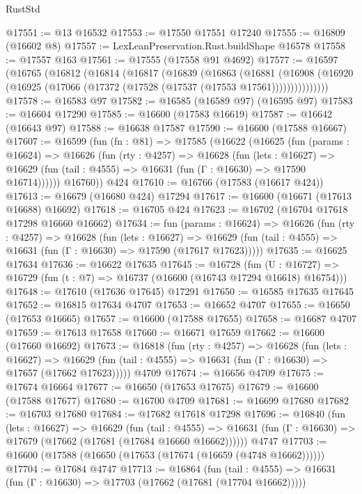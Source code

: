 \begin{lexlean}{RustStd}
\begin{coremodule}
{\begin{coremodule}
{{{{{{{{{{{{{{{{{{{{{{{{{{{{{{{{{{{{{{{{{{{{{{{{{{{{{{{@17551 := @13 @16532
@17553 := @17550 @17551 @17240
@17555 := @16809 (@16602 @8)
@17557 := LexLeanPreservation.Rust.buildShape @16578
@17558 := @17557 @163
@17561 := @17555 (@17558 @91 @4692)
@17577 := @16597
    (@16765
      (@16812
        (@16814
          (@16817
            (@16839
              (@16863
                (@16881
                  (@16908
                    (@16920 (@16925 (@17066 (@17372 (@17528 (@17537 (@17553 @17561)))))))))))))))
@17578 := @16583 @97
@17582 := @16585 (@16589 @97) (@16595 @97)
@17583 := @16604 @17290
@17585 := @16600 (@17583 @16619)
@17587 := @16642 (@16643 @97)
@17588 := @16638 @17587
@17590 := @16600 (@17588 @16667)
@17607 := @16599
    (fun (fn : @81) =>
    @17585
      (@16622
        (@16625
          (fun (params : @16624) =>
          @16626
            (fun (rty : @4257) =>
            @16628
              (fun (lets : @16627) =>
              @16629 (fun (tail : @4555) => @16631 (fun (Γ : @16630) => @17590 @16714))))))
        @16760))
    @424
@17610 := @16766 (@17583 (@16617 @424))
@17613 := @16679 (@16680 @424) @17294
@17617 := @16600 (@16671 (@17613 @16688) @16692)
@17618 := @16705 @424
@17623 := @16702 (@16704 @17618 @17298 @16660 @16662)
@17634 := fun (params : @16624) =>
  @16626
    (fun (rty : @4257) =>
    @16628
      (fun (lets : @16627) =>
      @16629 (fun (tail : @4555) => @16631 (fun (Γ : @16630) => @17590 (@17617 @17623)))))
@17635 := @16625 @17634
@17636 := @16622 @17635
@17645 := @16728
    (fun (U : @16727) => @16729 (fun (t : @7) => @16737 (@16600 (@16743 @17294 @16618) @16754)))
@17648 := @17610 (@17636 @17645) @17291
@17650 := @16585 @17635 @17645
@17652 := @16815 @17634 @4707
@17653 := @16652 @4707
@17655 := @16650 (@17653 @16665)
@17657 := @16600 (@17588 @17655)
@17658 := @16687 @4707
@17659 := @17613 @17658
@17660 := @16671 @17659
@17662 := @16600 (@17660 @16692)
@17673 := @16818
    (fun (rty : @4257) =>
    @16628
      (fun (lets : @16627) =>
      @16629 (fun (tail : @4555) => @16631 (fun (Γ : @16630) => @17657 (@17662 @17623)))))
    @4709
@17674 := @16656 @4709
@17675 := @17674 @16664
@17677 := @16650 (@17653 @17675)
@17679 := @16600 (@17588 @17677)
@17680 := @16700 @4709
@17681 := @16699 @17680
@17682 := @16703 @17680
@17684 := @17682 @17618 @17298
@17696 := @16840
    (fun (lets : @16627) =>
    @16629
      (fun (tail : @4555) =>
      @16631 (fun (Γ : @16630) => @17679 (@17662 (@17681 (@17684 @16660 @16662))))))
    @4747
@17703 := @16600 (@17588 (@16650 (@17653 (@17674 (@16659 (@4748 @16662))))))
@17704 := @17684 @4747
@17713 := @16864
    (fun (tail : @4555) => @16631 (fun (Γ : @16630) => @17703 (@17662 (@17681 (@17704 @16662)))))
}}}}}}}}}}}}}}}}}}}}}}}}}}}}}}}}}}}}}}}}}}}}}}}}}}}}}}}
\end{coremodule}}
\end{coremodule}
\end{lexlean}
